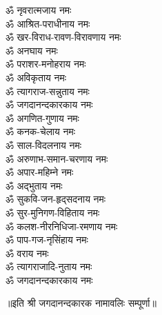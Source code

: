 \begin{flushleft}
\begin{multicols}{2}
ॐ नृवरात्मजाय नमः\hfill{}\\
ॐ आश्रित-पराधीनाय नमः\\
ॐ खर-विराध-रावण-विरावणाय नमः\\
ॐ अनघाय नमः\\
ॐ पराशर-मनोहराय नमः\\
ॐ अविकृताय नमः\\
ॐ त्यागराज-सन्नुताय नमः\\
ॐ जगदानन्दकारकाय नमः\\
ॐ अगणित-गुणाय नमः\\
ॐ कनक-चेलाय नमः\\
ॐ साल-विदलनाय नमः\hfill{}\\
ॐ अरुणाभ-समान-चरणाय नमः\\
ॐ अपार-महिम्ने नमः\\
ॐ अद्भुताय नमः\\
ॐ सुकवि-जन-हृद्सदनाय  नमः\\
ॐ सुर-मुनिगण-विहिताय नमः\\
ॐ कलश-नीरनिधिजा-रमणाय नमः\\
ॐ पाप-गज-नृसिंहाय नमः\\
ॐ वराय नमः\\
ॐ त्यागराजादि-नुताय नमः\\
ॐ जगदानन्दकारकाय नमः\hfill{}\\
\end{multicols}
\end{flushleft}
\centerline{॥इति श्री जगदानन्दकारक नामावलिः सम्पूर्णा॥}
